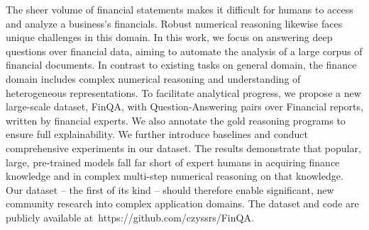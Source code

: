 The sheer volume of financial statements makes it difficult for humans to access and analyze a business's financials. Robust numerical reasoning likewise faces unique challenges in this domain. In this work, we focus on answering deep questions over financial data, aiming to automate the analysis of a large corpus of financial documents. In contrast to existing tasks on general domain, the finance domain includes complex numerical reasoning and understanding of heterogeneous representations. To facilitate analytical progress, we propose a new large-scale dataset, FinQA, with Question-Answering pairs over Financial reports, written by financial experts. We also annotate the gold reasoning programs to ensure full explainability. We further introduce baselines and conduct comprehensive experiments in our dataset. The results demonstrate that popular, large, pre-trained models fall far short of expert humans in acquiring finance knowledge and in complex multi-step numerical reasoning on that knowledge. Our dataset -- the first of its kind -- should therefore enable significant, new community research into complex application domains. The dataset and code are publicly available at https://github.com/czyssrs/FinQA.
